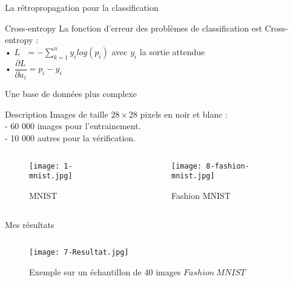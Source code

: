 \begin{frame}{La rétropropagation pour la classification}
    \begin{block}{Cross-entropy}
        La fonction d'erreur des problèmes de classification est Cross-entropy : \\
        • $L\ \ \ = -\sum_{k=1}^{n}y_ilog(p_i)$ avec $y_i$ la sortie attendue \\
        • $\dfrac{\partial L}{\partial a_i} = p_i - y_i$
    \end{block}
\end{frame}



\begin{frame}{Une base de données plus complexe}
    \begin{block}{Description}
        Images de taille $28 \times 28$ pixels en noir et blanc : \\
        \quad - 60 000 images pour l'entrainement. \\
        \quad - 10 000 autres pour la vérification.
    \end{block}
    \begin{columns}
        \begin{column}{0.5\textwidth}
            \begin{figure}
                \centering
                \texttt{[image: 1-mnist.jpg]}
                \caption{MNIST}
            \end{figure}
        \end{column}
        \begin{column}{0.5\textwidth}
            \begin{figure}
                \centering
                \texttt{[image: 8-fashion-mnist.jpg]}
                \caption{Fashion MNIST}
            \end{figure}
        \end{column}
    \end{columns}
\end{frame}


\begin{frame}{Mes résultats}
    \begin{columns}[T]
        \begin{column}{.75\textwidth}
            \begin{figure}
                \centering
                \texttt{[image: 7-Resultat.jpg]}
                \caption{Exemple sur un échantillon de 40 images $Fashion\ MNIST$}
            \end{figure}
        \end{column}
        \hfill
        \begin{column}{.25\textwidth}
            \bigskip	\bigskip	\bigskip
            
        \end{column}
    \end{columns}
\end{frame}



